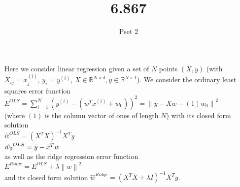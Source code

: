 \documentclass[1pt]{article}
\title{6.867}
\author{Pset 2}
\date{}
\newcommand{\norm}[1]{\left\lVert#1\right\rVert}
\begin{document}
\maketitle

\section{   }

Here we consider linear regression given a set of  $N$ points $(X, y)$ (with $X_{ij} = x^{(i)}_j$, $y_i = y^{(i)}$, $X \in \mathbb{R}^{N \times d}, y \in \mathbb{R}^{N \times 1}$). We consider the ordinary least squares error function \\
$E^{OLS} = \sum_{i=1}^{N} (y^{(i)} - (w^Tx^{(i)} + w_0))^2 = \norm{y - Xw - (1)w_0}^2$\\
(where $(1)$ is the column vector of ones of length $N$) with its closed form solution\\
$\hat{w}^{OLS} = (X^TX)^{-1}X^Ty$ \\
$\hat{w_0}^{OLS} = \Bar{y} - \Bar{x}^Tw$ \\
as well as the ridge regression error function\\
$E^{Ridge} = E^{OLS} + \lambda \norm{w}^2$\\
and its closed form solution 
$\hat{w}^{Ridge} = (X^TX + \lambda I)^{-1}X^Ty$.
\end{document}
